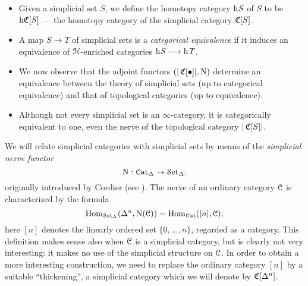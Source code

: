\begin{shaded}
\begin{itemize}
\begin{itemize}
\item Given a simplicial set $S$, we define the homotopy category $\rm{h} \it{S}$ of $S$ to be $\rm{h} \it{\operatorname{\mathfrak{C}}}[S]$ --- the homotopy category of the simplicial category $\operatorname{\mathfrak{C}}[S]$.
\item A map $S\to T$ of simplicial sets is a \textit{categorical equivalence} if it induces an equivalence of $\operatorname{\mathcal{H}}$-enriched categories $\rm{h} \it{S}\longrightarrow\rm{h} \it{T}$.
\item We now observe that the adjoint functors $(|\operatorname{\mathfrak{C}}[ \bullet ]|, \operatorname{N} )$
determine an equivalence between the theory of simplicial sets (up to categorical equivalence)
and that of topological categories (up to equivalence). 
\item Although not every simplicial set is an $\infty$-category, it is categorically equivalent to one, even the nerve of the topological category $|\operatorname{\mathfrak{C}}[S]|$.
\end{itemize}
\end{itemize}


\end{shaded}


We will relate simplicial categories with simplicial sets by means of the {\it simplicial nerve functor}
$$ \operatorname{N}: \operatorname{\mathcal{C}at_{\Delta}} \rightarrow \operatorname{\mathcal{S}et_{\Delta}},$$
originally introduced by Cordier (see \cite{coherentnerve}).
The nerve of an ordinary category $\operatorname{\mathcal{C}}$ is characterized by the formula
$$ \operatorname{Hom}_{ \operatorname{\mathcal{S}et_{\Delta}}}( \Delta^n, \operatorname{N}(\operatorname{\mathcal{C}})) = \operatorname{Hom}_{\operatorname{\mathcal{C}at}}( [n], \operatorname{\mathcal{C}} );$$
here $[n]$ denotes the linearly ordered set $\{ 0, \ldots, n\}$, regarded
as a category. This
definition makes sense also when $\operatorname{\mathcal{C}}$ is a simplicial
category, but is clearly not very interesting: it makes no use of
the simplicial structure on $\operatorname{\mathcal{C}}$. In order to obtain a more interesting construction,
we need to replace the ordinary category $[n]$ by a suitable ``thickening'', a simplicial
category which we will denote by $\operatorname{\mathfrak{C}}[\Delta^n]$.

